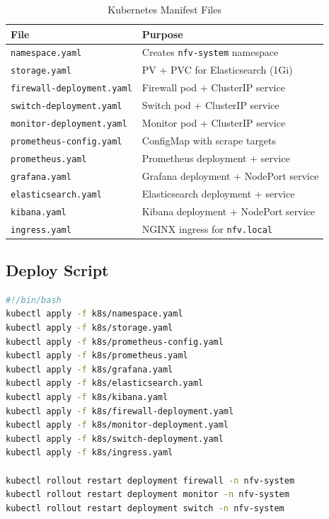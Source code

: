 \documentclass[12pt,a4paper]{article}
\begin{document}
\begin{table}[h]
\centering
\begin{tabular}{@{}lp{9cm}@{}}
\toprule
\textbf{File} & \textbf{Purpose} \\
\midrule
\texttt{namespace.yaml} & Creates \texttt{nfv-system} namespace \\
\texttt{storage.yaml} & PV + PVC for Elasticsearch (1Gi) \\
\texttt{firewall-deployment.yaml} & Firewall pod + ClusterIP service \\
\texttt{switch-deployment.yaml} & Switch pod + ClusterIP service \\
\texttt{monitor-deployment.yaml} & Monitor pod + ClusterIP service \\
\texttt{prometheus-config.yaml} & ConfigMap with scrape targets \\
\texttt{prometheus.yaml} & Prometheus deployment + service \\
\texttt{grafana.yaml} & Grafana deployment + NodePort service \\
\texttt{elasticsearch.yaml} & Elasticsearch deployment + service \\
\texttt{kibana.yaml} & Kibana deployment + NodePort service \\
\texttt{ingress.yaml} & NGINX ingress for \texttt{nfv.local} \\
\bottomrule
\end{tabular}
\caption{Kubernetes Manifest Files}
\end{table}

\subsection{Deploy Script}

\begin{lstlisting}[language=bash, caption=deploy.sh]
#!/bin/bash
kubectl apply -f k8s/namespace.yaml
kubectl apply -f k8s/storage.yaml
kubectl apply -f k8s/prometheus-config.yaml
kubectl apply -f k8s/prometheus.yaml
kubectl apply -f k8s/grafana.yaml
kubectl apply -f k8s/elasticsearch.yaml
kubectl apply -f k8s/kibana.yaml
kubectl apply -f k8s/firewall-deployment.yaml
kubectl apply -f k8s/monitor-deployment.yaml
kubectl apply -f k8s/switch-deployment.yaml
kubectl apply -f k8s/ingress.yaml

kubectl rollout restart deployment firewall -n nfv-system
kubectl rollout restart deployment monitor -n nfv-system
kubectl rollout restart deployment switch -n nfv-system
\end{lstlisting}
\end{document}
